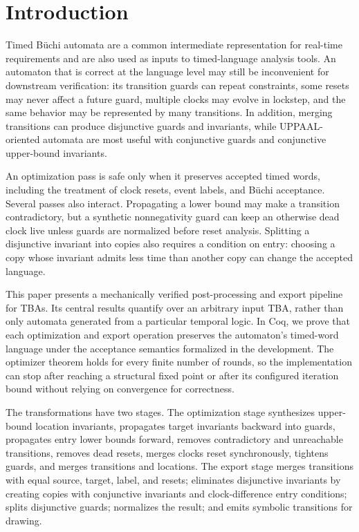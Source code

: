 \documentclass{ieeeaccess}
\begin{document}
\section{Introduction}
\label{sec:introduction}
Timed B\"uchi automata are a common intermediate representation for real-time requirements and are also used as inputs to timed-language analysis tools. An automaton that is correct at the language level may still be inconvenient for downstream verification: its transition guards can repeat constraints, some resets may never affect a future guard, multiple clocks may evolve in lockstep, and the same behavior may be represented by many transitions. In addition, merging transitions can produce disjunctive guards and invariants, while UPPAAL-oriented automata are most useful with conjunctive guards and conjunctive upper-bound invariants.

An optimization pass is safe only when it preserves accepted timed words, including the treatment of clock resets, event labels, and B\"uchi acceptance. Several passes also interact. Propagating a lower bound may make a transition contradictory, but a synthetic nonnegativity guard can keep an otherwise dead clock live unless guards are normalized before reset analysis. Splitting a disjunctive invariant into copies also requires a condition on entry: choosing a copy whose invariant admits less time than another copy can change the accepted language.

This paper presents a mechanically verified post-processing and export pipeline for TBAs. Its central results quantify over an arbitrary input TBA, rather than only automata generated from a particular temporal logic. In Coq, we prove that each optimization and export operation preserves the automaton's timed-word language under the acceptance semantics formalized in the development. The optimizer theorem holds for every finite number of rounds, so the implementation can stop after reaching a structural fixed point or after its configured iteration bound without relying on convergence for correctness.

The transformations have two stages. The optimization stage synthesizes upper-bound location invariants, propagates target invariants backward into guards, propagates entry lower bounds forward, removes contradictory and unreachable transitions, removes dead resets, merges clocks reset synchronously, tightens guards, and merges transitions and locations. The export stage merges transitions with equal source, target, label, and resets; eliminates disjunctive invariants by creating copies with conjunctive invariants and clock-difference entry conditions; splits disjunctive guards; normalizes the result; and emits symbolic transitions for drawing.
\end{document}
